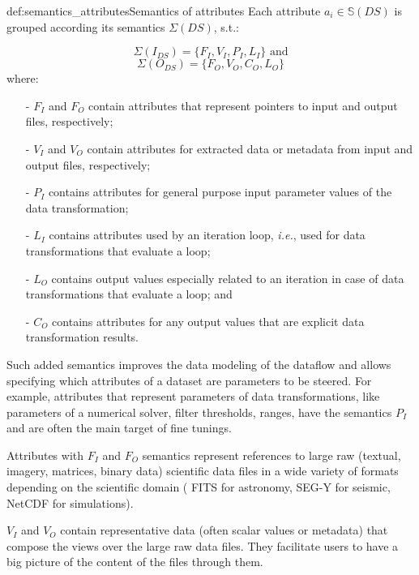 \begin{mydef}{def:semantics_attributes}{Semantics of attributes}
Each attribute $a_i \in \mathbb{S}(DS)$ is grouped according its semantics
$\Sigma(DS)$, s.t.:

$$\Sigma(I_{DS}) = \{F_I, V_I, P_I, L_I\} \text{ and} $$
$$\Sigma(O_{DS}) = \{F_O, V_O, C_O, L_O\}$$
where:
\begin{itemize}
\setlength\itemsep{-2mm}
\item[-] \noindent
  $F_I$ and $F_O$ contain attributes that represent pointers to
  input and output files, respectively;
\item[-] \noindent
  $V_I$ and $V_O$ contain attributes for extracted
  data or metadata from input and output files, respectively;
\item[-] \noindent
  $P_I$ contains attributes for general purpose input parameter
  values of the data transformation;
\item[-] \noindent
  $L_I$ contains attributes used by an iteration loop, \emph{i.e.},
  used for data transformations that evaluate a loop;
\item[-] \noindent
  $L_O$ contains output values especially related to an iteration
  in case of data transformations that evaluate a loop; and
\item[-] \noindent
  $C_O$ contains attributes for any output values that are explicit
  data transformation results.
\end{itemize}

\end{mydef}

Such added semantics improves the data modeling of the dataflow and
allows specifying which attributes of a dataset are parameters to
be steered. For example, attributes that represent parameters of data transformations, like
parameters of a numerical solver, filter thresholds, ranges, have the semantics $P_I$ and are often the main target of fine tunings.

Attributes with $F_I$ and $F_O$ semantics represent references to large raw (textual, imagery, matrices,
binary data) scientific data files in a wide variety of formats
depending on the scientific domain (\eg{} FITS for astronomy,
SEG-Y for seismic, NetCDF for  simulations).

$V_I$ and $V_O$ contain representative data (often scalar values or metadata) that compose the views over the large raw data files. They facilitate users to have a big picture of the content of
the files through them.

